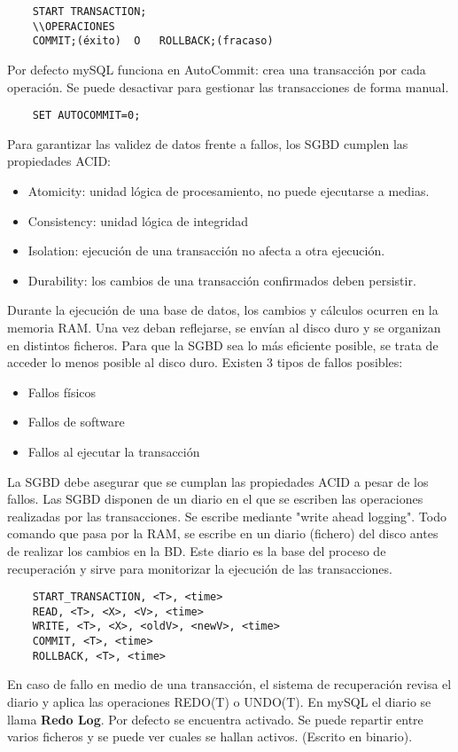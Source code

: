 \documentclass{article}
\begin{document}
\begin{verbatim}
	START TRANSACTION;
	\\OPERACIONES
	COMMIT;(éxito)	O 	ROLLBACK;(fracaso)
\end{verbatim}
Por defecto mySQL funciona en AutoCommit: crea una transacción por cada operación. Se puede desactivar para gestionar las transacciones de forma manual.
\begin{verbatim}
	SET AUTOCOMMIT=0;
\end{verbatim}
Para garantizar las validez de datos frente a fallos, los SGBD cumplen las propiedades ACID:
\begin{itemize}
	\item Atomicity: unidad lógica de procesamiento, no puede ejecutarse a medias.
	\item Consistency: unidad lógica de integridad
	\item Isolation: ejecución de una transacción no afecta a otra ejecución.
	\item Durability: los cambios de una transacción confirmados deben persistir.
\end{itemize}
Durante la ejecución de una base de datos, los cambios y cálculos ocurren en la memoria RAM. Una vez deban reflejarse, se envían al disco duro y se organizan en distintos ficheros. Para que la SGBD sea lo más eficiente posible, se trata de acceder lo menos posible al disco duro. 
Existen 3 tipos de fallos posibles:
\begin{itemize}
	\item Fallos físicos
	\item Fallos de software
	\item Fallos al ejecutar la transacción
\end{itemize}
La SGBD debe asegurar que se cumplan las propiedades ACID a pesar de los fallos. 
Las SGBD disponen de un diario en el que se escriben las operaciones realizadas por las transacciones. Se escribe mediante "write ahead logging". Todo comando que pasa por la RAM, se escribe en un diario (fichero) del disco antes de realizar los cambios en la BD. Este diario es la base del proceso de recuperación y sirve para monitorizar la ejecución de las transacciones. 
\begin{verbatim}
	START_TRANSACTION, <T>, <time>
	READ, <T>, <X>, <V>, <time>
	WRITE, <T>, <X>, <oldV>, <newV>, <time>
	COMMIT, <T>, <time>
	ROLLBACK, <T>, <time>
\end{verbatim}
En caso de fallo en medio de una transacción, el sistema de recuperación revisa el diario y aplica las operaciones REDO(T) o UNDO(T). 
En mySQL el diario se llama \textbf{Redo Log}. Por defecto se encuentra activado. Se puede repartir entre varios ficheros y se puede ver cuales se hallan activos. (Escrito en binario).
\end{document}

